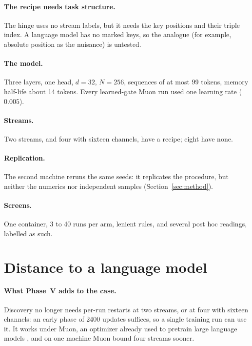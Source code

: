\documentclass[11pt]{article}
\begin{document}
\paragraph{The recipe needs task structure.} The hinge uses no stream labels, but it needs the key positions and their triple index. A language model has no marked keys, so the analogue (for example, absolute position as the nuisance) is untested.

\paragraph{The model.} Three layers, one head, $d = 32$, $N = 256$, sequences of at most 99 tokens, memory half-life about 14 tokens. Every learned-gate Muon run used one learning rate ($0.005$).

\paragraph{Streams.} Two streams, and four with sixteen channels, have a recipe; eight have none.

\paragraph{Replication.} The second machine reruns the same seeds: it replicates the procedure, but neither the numerics nor independent samples (Section~\ref{sec:method}).

\paragraph{Screens.} One container, 3 to 40 runs per arm, lenient rules, and several post hoc readings, labelled as such.

\section{Distance to a language model}
\label{sec:lm}

\paragraph{What Phase~V adds to the case.} Discovery no longer needs per-run restarts at two streams, or at four with sixteen channels: an early phase of 2400 updates suffices, so a single training run can use it. It works under Muon, an optimizer already used to pretrain large language models \cite{muonscale}, and on one machine Muon bound four streams sooner.
\end{document}
